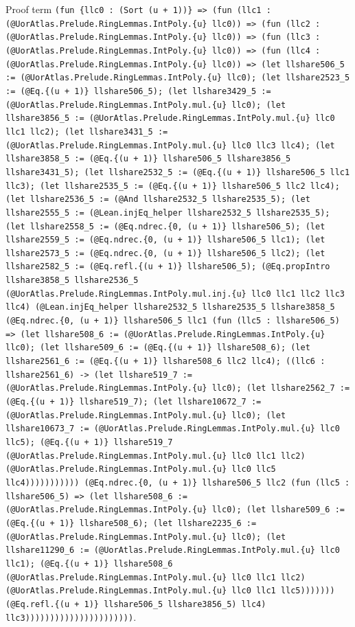 \documentclass[11pt]{article}
\begin{document}
\noindent Proof term \texttt{(fun \{llc0 : (Sort (u + 1))\} => (fun (llc1 : (@UorAtlas.Prelude.RingLemmas.IntPoly.\{u\} llc0)) => (fun (llc2 : (@UorAtlas.Prelude.RingLemmas.IntPoly.\{u\} llc0)) => (fun (llc3 : (@UorAtlas.Prelude.RingLemmas.IntPoly.\{u\} llc0)) => (fun (llc4 : (@UorAtlas.Prelude.RingLemmas.IntPoly.\{u\} llc0)) => (let llshare506\_5 := (@UorAtlas.Prelude.RingLemmas.IntPoly.\{u\} llc0); (let llshare2523\_5 := (@Eq.\{(u + 1)\} llshare506\_5); (let llshare3429\_5 := (@UorAtlas.Prelude.RingLemmas.IntPoly.mul.\{u\} llc0); (let llshare3856\_5 := (@UorAtlas.Prelude.RingLemmas.IntPoly.mul.\{u\} llc0 llc1 llc2); (let llshare3431\_5 := (@UorAtlas.Prelude.RingLemmas.IntPoly.mul.\{u\} llc0 llc3 llc4); (let llshare3858\_5 := (@Eq.\{(u + 1)\} llshare506\_5 llshare3856\_5 llshare3431\_5); (let llshare2532\_5 := (@Eq.\{(u + 1)\} llshare506\_5 llc1 llc3); (let llshare2535\_5 := (@Eq.\{(u + 1)\} llshare506\_5 llc2 llc4); (let llshare2536\_5 := (@And llshare2532\_5 llshare2535\_5); (let llshare2555\_5 := (@Lean.injEq\_helper llshare2532\_5 llshare2535\_5); (let llshare2558\_5 := (@Eq.ndrec.\{0, (u + 1)\} llshare506\_5); (let llshare2559\_5 := (@Eq.ndrec.\{0, (u + 1)\} llshare506\_5 llc1); (let llshare2573\_5 := (@Eq.ndrec.\{0, (u + 1)\} llshare506\_5 llc2); (let llshare2582\_5 := (@Eq.refl.\{(u + 1)\} llshare506\_5); (@Eq.propIntro llshare3858\_5 llshare2536\_5 (@UorAtlas.Prelude.RingLemmas.IntPoly.mul.inj.\{u\} llc0 llc1 llc2 llc3 llc4) (@Lean.injEq\_helper llshare2532\_5 llshare2535\_5 llshare3858\_5 (@Eq.ndrec.\{0, (u + 1)\} llshare506\_5 llc1 (fun (llc5 : llshare506\_5) => (let llshare508\_6 := (@UorAtlas.Prelude.RingLemmas.IntPoly.\{u\} llc0); (let llshare509\_6 := (@Eq.\{(u + 1)\} llshare508\_6); (let llshare2561\_6 := (@Eq.\{(u + 1)\} llshare508\_6 llc2 llc4); ((llc6 : llshare2561\_6) -> (let llshare519\_7 := (@UorAtlas.Prelude.RingLemmas.IntPoly.\{u\} llc0); (let llshare2562\_7 := (@Eq.\{(u + 1)\} llshare519\_7); (let llshare10672\_7 := (@UorAtlas.Prelude.RingLemmas.IntPoly.mul.\{u\} llc0); (let llshare10673\_7 := (@UorAtlas.Prelude.RingLemmas.IntPoly.mul.\{u\} llc0 llc5); (@Eq.\{(u + 1)\} llshare519\_7 (@UorAtlas.Prelude.RingLemmas.IntPoly.mul.\{u\} llc0 llc1 llc2) (@UorAtlas.Prelude.RingLemmas.IntPoly.mul.\{u\} llc0 llc5 llc4))))))))))) (@Eq.ndrec.\{0, (u + 1)\} llshare506\_5 llc2 (fun (llc5 : llshare506\_5) => (let llshare508\_6 := (@UorAtlas.Prelude.RingLemmas.IntPoly.\{u\} llc0); (let llshare509\_6 := (@Eq.\{(u + 1)\} llshare508\_6); (let llshare2235\_6 := (@UorAtlas.Prelude.RingLemmas.IntPoly.mul.\{u\} llc0); (let llshare11290\_6 := (@UorAtlas.Prelude.RingLemmas.IntPoly.mul.\{u\} llc0 llc1); (@Eq.\{(u + 1)\} llshare508\_6 (@UorAtlas.Prelude.RingLemmas.IntPoly.mul.\{u\} llc0 llc1 llc2) (@UorAtlas.Prelude.RingLemmas.IntPoly.mul.\{u\} llc0 llc1 llc5))))))) (@Eq.refl.\{(u + 1)\} llshare506\_5 llshare3856\_5) llc4) llc3))))))))))))))))))))))}.\par
\end{document}
